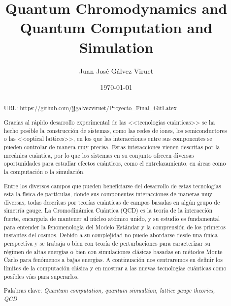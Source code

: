 \documentclass[a4paper,10pt]{article}
\begin{document}
\title{Quantum Chromodynamics and \\ Quantum Computation and Simulation}
\author{Juan José Gálvez Viruet}
\date{\today}
\maketitle

\begin{abstract}
\noindent URL: https://github.com/jjgalvezviruet/Proyecto\_Final\_GitLatex

Gracias al rápido desarrollo experimental de las <<tecnologías cuánticas>> se ha hecho posible la construcción de sistemas, como las redes de iones, los semiconductores o las <<optical lattices>>, en los que las interacciones entre sus componentes se pueden controlar de manera muy precisa. Estas interacciones vienen descritas por la mecánica cuántica, por lo que los sistemas en su conjunto ofrecen diversas oportunidades para estudiar efectos cuánticos, como el entrelazamiento, en áreas como la computación o la simulación.

Entre los diversos campos que pueden beneficiarse del desarrollo de estas tecnologías esta la física de partículas, donde sus componentes interacciones de maneras muy diversas, todas descritas por teorías cuánticas de campos basadas en algún grupo de simetría gauge. La Cromodinámica Cuántica (QCD) es la teoría de la interacción fuerte, encargada de mantener al núcleo atómico unido, y su estudio es fundamental para entender la fenomenología del Modelo Estándar y la comprensión de los primeros instantes del cosmos. Debido a su complejidad no puede abordarse desde una única perspectiva y se trabaja o bien con teoría de perturbaciones para caracterizar su régimen de altas energías o bien con simulaciones clásicas basadas en métodos Monte Carlo para fenómenos a bajas energías. A continuación nos centraremos en definir los límites de la computación clásica y en mostrar a las nuevas tecnologías cuánticas como posibles vías para superarlos.

Palabras clave: \textit{Quantum computation, quantum simualtion, lattice gauge theories, QCD}
\end{abstract}
\end{document}
